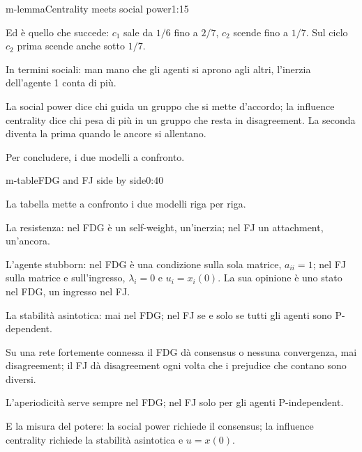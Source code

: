 \begin{slidedue}{m-lemma}{Centrality meets social power}{1:15 {\color{red}}}
\begin{discorso}
    \item {\color{blue}\clic Ed è quello che succede: $c_1$ sale da $1/6$ fino a $2/7$, $c_2$ scende fino a $1/7$. Sul ciclo $c_2$ prima scende anche sotto $1/7$.}
    \item In termini sociali: man mano che gli agenti si aprono agli altri, l'inerzia dell'agente 1 conta di più.
    \item La social power dice chi guida un gruppo che si mette d'accordo; la influence centrality dice chi pesa di più in un gruppo che resta in {\color{red}} {\color{blue}disagreement.} La seconda diventa la prima quando le ancore si allentano.
    \item Per concludere, i due modelli a confronto.
  \end{discorso}
\end{slidedue}

\begin{slide}{m-table}{FDG and FJ side by side}{0:40}
  \begin{discorso}
    \item La tabella mette a confronto i due modelli riga per riga.
    \item La resistenza: nel FDG è un self-weight, un'inerzia; nel FJ un {\color{red}} {\color{blue}attachment,} un'ancora.
    \item L'agente stubborn: nel FDG è una condizione sulla sola matrice, $a_{ii}=1$; nel FJ sulla matrice e sull'ingresso, $\lambda_i=0$ e $u_i=x_i(0)$. La sua opinione è uno stato nel FDG, un ingresso nel FJ.
    \item La stabilità asintotica: mai nel FDG; nel FJ se e solo se tutti gli agenti sono P-dependent.
    \item Su una rete fortemente connessa il FDG dà {\color{red}} {\color{blue}consensus} o nessuna convergenza, mai {\color{red}} {\color{blue}disagreement;} il FJ dà {\color{red}} {\color{blue}disagreement} ogni volta che i {\color{red}} {\color{blue}prejudice} che contano sono diversi.
    \item L'aperiodicità serve sempre nel FDG; nel FJ solo per gli agenti P-independent.
    \item E la misura del potere: la social power richiede il {\color{red}} {\color{blue}consensus;} la influence centrality richiede la stabilità asintotica e $u=x(0)$.
  \end{discorso}
\end{slide}

